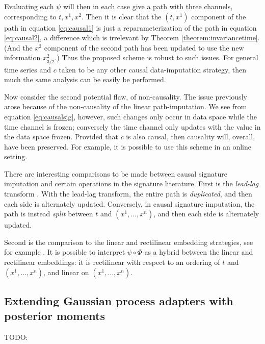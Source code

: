 \documentclass{article}
\begin{document}
Evaluating each $\psi$ will then in each case give a path with three channels, corresponding to $t, x^1, x^2$. Then it is clear that the $(t, x^1)$ component of the path in equation \eqref{eq:causal1} is just a reparameterization of the path in equation \eqref{eq:causal2}, a difference which is irrelevant by Theorem \ref{theorem:invariancetime}. (And the $x^2$ component of the second path has been updated to use the new information $x_{3/2}^2$.) Thus the proposed scheme is robust to such issues. For general time series and $c$ taken to be any other causal data-imputation strategy, then much the same analysis can be easily be performed.

Now consider the second potential flaw, of non-causality. The issue previously arose because of the non-causality of the linear path-imputation. We see from equation \eqref{eq:causalsig}, however, such changes only occur in data space while the time channel is frozen; conversely the time channel only updates with the value in the data space frozen. Provided that $c$ is also causal, then causality will, overall, have been preserved. For example, it is possible to use this scheme in an online setting.

There are interesting comparisons to be made between causal signature imputation and certain operations in the signature literature. First is the \emph{lead-lag} transform \cite{primer2016}. With the lead-lag transform, the entire path is \emph{duplicated}, and then each side is alternately updated. Conversely, in causal signature imputation, the path is instead \emph{split} between $t$ and $(x^1, \ldots, x^n)$, and then each side is alternately updated.

Second is the comparison to the linear and rectilinear embedding strategies, see for example \cite{fermanian2019embedding}. It is possible to interpret $\psi \circ \Phi$ as a hybrid between the linear and rectilinear embeddings: it is rectilinear with respect to an ordering of $t$ and $(x^1, \ldots, x^n)$, and linear on $(x^1, \ldots, x^n)$.

\subsection{Extending Gaussian process adapters with posterior moments}\label{section:ourgpadapter}
TODO: %
\end{document}
